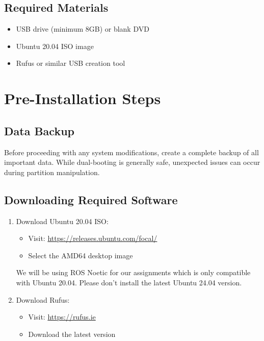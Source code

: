 \documentclass[11pt,a4paper]{article}
\newenvironment{warning}
{\begin{tcolorbox}[colback=warningcolor!10,colframe=warningcolor,title=\textbf{Warning}]}
{\end{tcolorbox}}
\newenvironment{note}
{\begin{tcolorbox}[colback=notecolor!10,colframe=notecolor,title=\textbf{Note}]}
{\end{tcolorbox}}
\begin{document}
\subsection{Required Materials}
\begin{itemize}
    \item USB drive (minimum 8GB) or blank DVD
    \item Ubuntu 20.04 ISO image
    \item Rufus or similar USB creation tool
\end{itemize}

\section{Pre-Installation Steps}
\subsection{Data Backup}
\begin{warning}
Before proceeding with any system modifications, create a complete backup of all important data. While dual-booting is generally safe, unexpected issues can occur during partition manipulation.
\end{warning}

\subsection{Downloading Required Software}
\begin{enumerate}
    \item Download Ubuntu 20.04 ISO:
    \begin{itemize}
        \item Visit: \url{https://releases.ubuntu.com/focal/}
        \item Select the AMD64 desktop image
    \end{itemize}
    \begin{note}
    We will be using ROS Noetic for our assignments which is only compatible with Ubuntu 20.04. Please don't install the latest Ubuntu 24.04 version.
    \end{note}
    \item Download Rufus:
    \begin{itemize}
        \item Visit: \url{https://rufus.ie}
        \item Download the latest version
    \end{itemize}
\end{enumerate}
\end{document}
